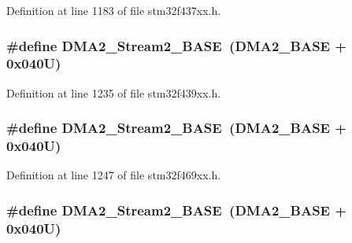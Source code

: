 Definition at line 1183 of file stm32f437xx.\+h.

\subsubsection[{\texorpdfstring{D\+M\+A2\+\_\+\+Stream2\+\_\+\+B\+A\+SE}{DMA2_Stream2_BASE}}]{\setlength{\rightskip}{0pt plus 5cm}\#define D\+M\+A2\+\_\+\+Stream2\+\_\+\+B\+A\+SE~({\bf D\+M\+A2\+\_\+\+B\+A\+SE} + 0x040\+U)}\hypertarget{group___peripheral__memory__map_gaed33a06f08188466f2ede06160984e9a}{}\label{group___peripheral__memory__map_gaed33a06f08188466f2ede06160984e9a}


Definition at line 1235 of file stm32f439xx.\+h.

\subsubsection[{\texorpdfstring{D\+M\+A2\+\_\+\+Stream2\+\_\+\+B\+A\+SE}{DMA2_Stream2_BASE}}]{\setlength{\rightskip}{0pt plus 5cm}\#define D\+M\+A2\+\_\+\+Stream2\+\_\+\+B\+A\+SE~({\bf D\+M\+A2\+\_\+\+B\+A\+SE} + 0x040\+U)}\hypertarget{group___peripheral__memory__map_gaed33a06f08188466f2ede06160984e9a}{}\label{group___peripheral__memory__map_gaed33a06f08188466f2ede06160984e9a}


Definition at line 1247 of file stm32f469xx.\+h.

\subsubsection[{\texorpdfstring{D\+M\+A2\+\_\+\+Stream2\+\_\+\+B\+A\+SE}{DMA2_Stream2_BASE}}]{\setlength{\rightskip}{0pt plus 5cm}\#define D\+M\+A2\+\_\+\+Stream2\+\_\+\+B\+A\+SE~({\bf D\+M\+A2\+\_\+\+B\+A\+SE} + 0x040\+U)}\hypertarget{group___peripheral__memory__map_gaed33a06f08188466f2ede06160984e9a}{}\label{group___peripheral__memory__map_gaed33a06f08188466f2ede06160984e9a}


